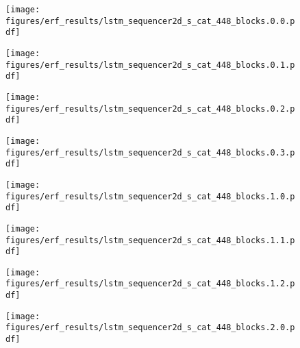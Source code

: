 \documentclass{article}
\begin{document}
\begin{figure}[tb]
  \raggedright
  \begin{minipage}[t]{0.13\hsize}
    \centering
    \texttt{[image: figures/erf\_results/lstm\_sequencer2d\_s\_cat\_448\_blocks.0.0.pdf]}
    \label{figure:erf_sequencer_448:0}
  \end{minipage}
  \begin{minipage}[t]{0.13\hsize}
    \centering
    \texttt{[image: figures/erf\_results/lstm\_sequencer2d\_s\_cat\_448\_blocks.0.1.pdf]}
    \label{figure:erf_sequencer_448:1}
  \end{minipage}
  \begin{minipage}[t]{0.13\hsize}
    \centering
    \texttt{[image: figures/erf\_results/lstm\_sequencer2d\_s\_cat\_448\_blocks.0.2.pdf]}
    \label{figure:erf_sequencer_448:2}
  \end{minipage}
  \begin{minipage}[t]{0.13\hsize}
    \centering
    \texttt{[image: figures/erf\_results/lstm\_sequencer2d\_s\_cat\_448\_blocks.0.3.pdf]}
    \label{figure:erf_sequencer_448:3}
  \end{minipage}
  \begin{minipage}[t]{0.13\hsize}
    \centering
    \texttt{[image: figures/erf\_results/lstm\_sequencer2d\_s\_cat\_448\_blocks.1.0.pdf]}
    \label{figure:erf_sequencer_448:4}
  \end{minipage}
  \begin{minipage}[t]{0.13\hsize}
    \centering
    \texttt{[image: figures/erf\_results/lstm\_sequencer2d\_s\_cat\_448\_blocks.1.1.pdf]}
    \label{figure:erf_sequencer_448:5}
  \end{minipage}
  \begin{minipage}[t]{0.13\hsize}
    \centering
    \texttt{[image: figures/erf\_results/lstm\_sequencer2d\_s\_cat\_448\_blocks.1.2.pdf]}
    \label{figure:erf_sequencer_448:6}
  \end{minipage}
  \begin{minipage}[t]{0.13\hsize}
    \centering
    \texttt{[image: figures/erf\_results/lstm\_sequencer2d\_s\_cat\_448\_blocks.2.0.pdf]}
    \label{figure:erf_sequencer_448:7}
  \end{minipage}
  \begin{minipage}[t]{0.13\hsize}

\end{minipage}
\end{figure}
\end{document}
